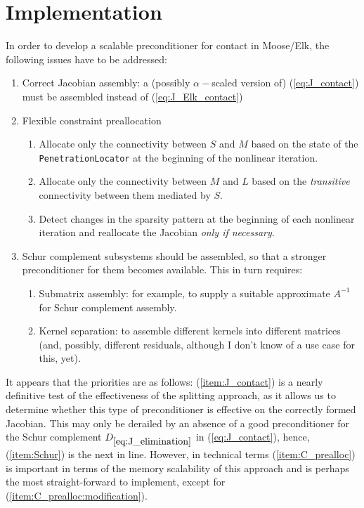 \documentclass[11pt]{article}
\begin{document}
\section{Implementation\label{sec:implementation}}
In order to develop a scalable preconditioner for contact in Moose/Elk, the following issues have to be addressed:
\begin{enumerate}[I]
\item \label{item:J_contact} Correct Jacobian assembly: a (possibly $\alpha-$scaled version of) (\ref{eq:J_contact}) must be assembled instead of (\ref{eq:J_Elk_contact})
\item \label{item:C_prealloc} Flexible constraint preallocation
\begin{enumerate}[i]
  \item \label{item:C_prealloc:contact} Allocate only the connectivity between $S$ and $M$ based on the state of the \texttt{PenetrationLocator} at the beginning of the nonlinear iteration.
  \item \label{item:C_prealloc:transitive} Allocate only the connectivity between $M$ and $L$ based on the \emph{transitive} connectivity between them mediated by $S$.
  \item \label{item:C_prealloc:modification} Detect changes in the sparsity pattern at the beginning of each nonlinear iteration and reallocate the Jacobian \emph{only if necessary}.
\end{enumerate}
\item \label{item:Schur} Schur complement subsystems should be assembled, so that a stronger preconditioner for them becomes available. This in turn requires:
\begin{enumerate}[i]
  \item \label{item:Schur:subassembly} Submatrix assembly: for example, to supply a suitable approximate $A^{-1}$ for Schur complement assembly.
  \item \label{item:Schur:subkernels} Kernel separation: to assemble different kernels into different matrices (and, possibly, different residuals, although I don't know of a use case for this, yet).
\end{enumerate}
\end{enumerate}
It appears that the priorities are as follows: (\ref{item:J_contact}) is a nearly definitive test of the effectiveness of the splitting approach, as it allows us to determine whether this type
of preconditioner is effective on the correctly formed Jacobian.  This may only be derailed by an absence of a good preconditioner for the Schur complement $D_{\ref{eq:J_elimination}}$ in (\ref{eq:J_contact}),
hence, (\ref{item:Schur}) is the next in line.  However, in technical terms (\ref{item:C_prealloc}) is important in terms of the memory scalability of this approach and is perhaps the most straight-forward
to implement, except for (\ref{item:C_prealloc:modification}).
\end{document}
